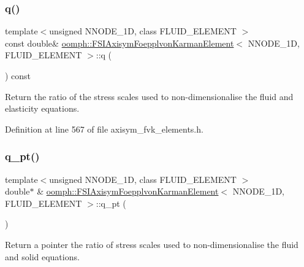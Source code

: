 \subsubsection{\texorpdfstring{q()}{q()}}
{\footnotesize\ttfamily template$<$unsigned N\+N\+O\+D\+E\+\_\+1D, class F\+L\+U\+I\+D\+\_\+\+E\+L\+E\+M\+E\+NT $>$ \\
const double\& \hyperlink{classoomph_1_1FSIAxisymFoepplvonKarmanElement}{oomph\+::\+F\+S\+I\+Axisym\+Foepplvon\+Karman\+Element}$<$ N\+N\+O\+D\+E\+\_\+1D, F\+L\+U\+I\+D\+\_\+\+E\+L\+E\+M\+E\+NT $>$\+::q (\begin{DoxyParamCaption}{ }\end{DoxyParamCaption}) const\hspace{0.3cm}{\ttfamily [inline]}}



Return the ratio of the stress scales used to non-\/dimensionalise the fluid and elasticity equations. 



Definition at line 567 of file axisym\+\_\+fvk\+\_\+elements.\+h.

\mbox{\label{classoomph_1_1FSIAxisymFoepplvonKarmanElement_ad348cd2e740d5bf8ca88c1f8409bd27f}} 
\subsubsection{\texorpdfstring{q\+\_\+pt()}{q\_pt()}}
{\footnotesize\ttfamily template$<$unsigned N\+N\+O\+D\+E\+\_\+1D, class F\+L\+U\+I\+D\+\_\+\+E\+L\+E\+M\+E\+NT $>$ \\
double$\ast$ \& \hyperlink{classoomph_1_1FSIAxisymFoepplvonKarmanElement}{oomph\+::\+F\+S\+I\+Axisym\+Foepplvon\+Karman\+Element}$<$ N\+N\+O\+D\+E\+\_\+1D, F\+L\+U\+I\+D\+\_\+\+E\+L\+E\+M\+E\+NT $>$\+::q\+\_\+pt (\begin{DoxyParamCaption}{ }\end{DoxyParamCaption})\hspace{0.3cm}{\ttfamily [inline]}}



Return a pointer the ratio of stress scales used to non-\/dimensionalise the fluid and solid equations. 




